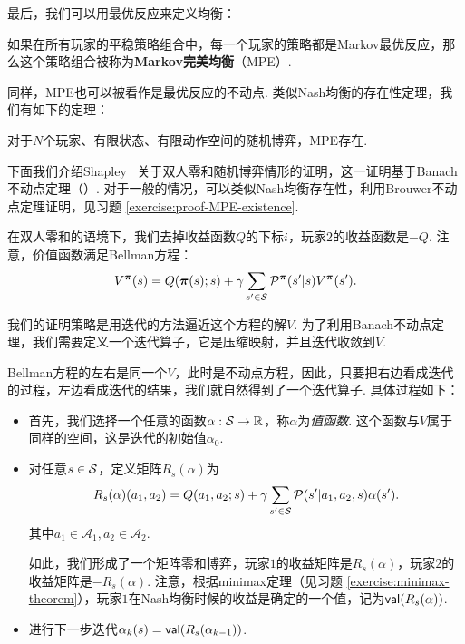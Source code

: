 最后，我们可以用最优反应来定义均衡：

\begin{definition}
    如果在所有玩家的平稳策略组合中，每一个玩家的策略都是Markov最优反应，那么这个策略组合被称为\textbf{Markov完美均衡}（MPE）.
\end{definition}

同样，MPE也可以被看作是最优反应的不动点. 类似Nash均衡的存在性定理，我们有如下的定理：

\begin{theorem}[MPE存在性定理]\label{thm:MPE-existence}
对于$N$个玩家、有限状态、有限动作空间的随机博弈，MPE存在.
\end{theorem}

下面我们介绍Shapley~\cite{shapleyStochasticGames1953} 关于双人零和随机博弈情形的证明，这一证明基于Banach不动点定理（）. 对于一般的情况，可以类似Nash均衡存在性，利用Brouwer不动点定理证明，见习题 \ref{exercise:proof-MPE-existence}.

在双人零和的语境下，我们去掉收益函数$Q$的下标$i$，玩家$2$的收益函数是$-Q$. 注意，价值函数满足Bellman方程：
    \[V^{\boldsymbol \pi}(s) = Q(\boldsymbol \pi(s);s) + \gamma \sum_{s'\in \mathcal S} \mathcal P^{\boldsymbol\pi}(s'|s)V^{\boldsymbol \pi}(s').\]

我们的证明策略是用迭代的方法逼近这个方程的解$V$. 为了利用Banach不动点定理，我们需要定义一个迭代算子，它是压缩映射，并且迭代收敛到$V$. 

Bellman方程的左右是同一个$V$，此时是不动点方程，因此，只要把右边看成迭代的过程，左边看成迭代的结果，我们就自然得到了一个迭代算子. 具体过程如下：
\begin{itemize}
    \item 首先，我们选择一个任意的函数$\alpha: \mathcal S\to \mathbb{R}$，称$\alpha$为\textit{值函数}. 这个函数与$V$属于同样的空间，这是迭代的初始值$\alpha_0$.
    \item 对任意$s\in \mathcal S$，定义矩阵$R_s(\alpha)$为
    \[R_s(\alpha)(a_1,a_2) = Q(a_1,a_2;s) + \gamma \sum_{s'\in \mathcal S}\mathcal P(s'|a_1,a_2,s)\alpha(s').\]
    其中$a_1\in \mathcal A_1, a_2\in \mathcal A_2$.
    
    如此，我们形成了一个矩阵零和博弈，玩家$1$的收益矩阵是$R_s(\alpha)$，玩家$2$的收益矩阵是$-R_s(\alpha)$. 注意，根据minimax定理（见习题 \ref{exercise:minimax-theorem}），玩家$1$在Nash均衡时候的收益是确定的一个值，记为$\mathsf{val}(R_s(\alpha))$.
    \item 进行下一步迭代$\alpha_k(s)=\mathsf{val}(R_s(\alpha_{k-1}))$. 
\end{itemize}

